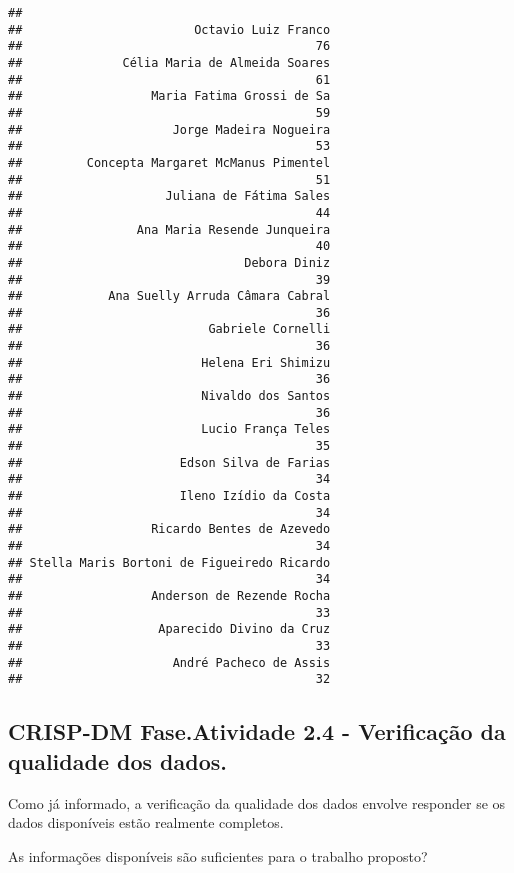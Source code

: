 \documentclass[]{article}
\begin{document}
\begin{verbatim}
## 
##                        Octavio Luiz Franco 
##                                         76 
##              Célia Maria de Almeida Soares 
##                                         61 
##                  Maria Fatima Grossi de Sa 
##                                         59 
##                     Jorge Madeira Nogueira 
##                                         53 
##         Concepta Margaret McManus Pimentel 
##                                         51 
##                    Juliana de Fátima Sales 
##                                         44 
##                Ana Maria Resende Junqueira 
##                                         40 
##                               Debora Diniz 
##                                         39 
##            Ana Suelly Arruda Câmara Cabral 
##                                         36 
##                          Gabriele Cornelli 
##                                         36 
##                         Helena Eri Shimizu 
##                                         36 
##                         Nivaldo dos Santos 
##                                         36 
##                         Lucio França Teles 
##                                         35 
##                      Edson Silva de Farias 
##                                         34 
##                      Ileno Izídio da Costa 
##                                         34 
##                  Ricardo Bentes de Azevedo 
##                                         34 
## Stella Maris Bortoni de Figueiredo Ricardo 
##                                         34 
##                  Anderson de Rezende Rocha 
##                                         33 
##                   Aparecido Divino da Cruz 
##                                         33 
##                     André Pacheco de Assis 
##                                         32
\end{verbatim}

\subsection{CRISP-DM Fase.Atividade 2.4 - Verificação da qualidade dos
dados.}\label{crisp-dm-fase.atividade-2.4---verificacao-da-qualidade-dos-dados.}

Como já informado, a verificação da qualidade dos dados envolve
responder se os dados disponíveis estão realmente completos.

As informações disponíveis são suficientes para o trabalho proposto?
\end{document}

